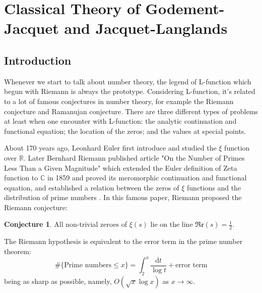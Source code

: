 \documentclass[12pt,a4paper,english]{article}
\theoremstyle{plain}
\theoremstyle{definition}
\newtheorem{conj}{Conjecture}
\begin{document}
\vspace{0.5cm}
\section{Classical Theory of Godement-Jacquet and Jacquet-Langlands}
\subsection{Introduction}
Whenever we start to talk about number theory, the legend of L-function which begun with Riemann is always the prototype. Considering L-function, it's related to a lot of famous conjectures in number theory, for example the Riemann conjecture and Ramanujan conjecture. There are three different types of problems at least when one encounter with L-function: the analytic continuation and functional equation; the location of the zeros; and the values at special points.

About 170 years ago, Leonhard Euler first introduce and studied the $\xi$ function over $\mathbb{R}$. Later Bernhard Riemann published article "On the Number of Primes Less Than a Given Magnitude" which extended the Euler definition of Zeta function to $\mathbb{C}$ in 1859 and proved its meromorphic continuation and functional equation, and established a relation between the zeros of $\xi$ functions and the distribution of prime numbers \cite{riemann1859ueber}. In this famous paper, Riemann proposed the Riemann conjecture:
\begin{conj}
All non-trivial zeroes of $\xi(s)$ lie on the line $\mathfrak{Re}(s)=\frac{1}{2}$. 

The Riemann hypothesis is equivalent to the error term in the prime number theorem:
\begin{equation*}
    \#\{\text{Prime numbers}\leq x\}=\int^{x}_{2}\frac{\text{d}t}{\log t}+\text{error term}
\end{equation*}
being as sharp as possible, namely, $O(\sqrt{x}\log x)$ as $x\rightarrow\infty$.
\end{conj}
\end{document}
